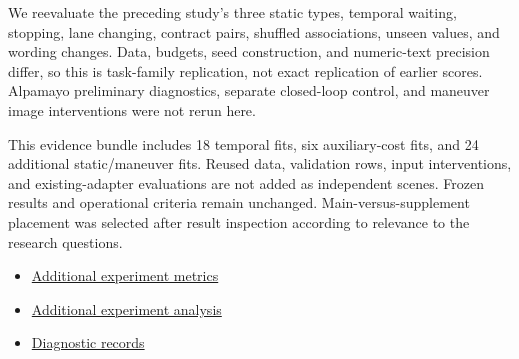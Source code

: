 \documentclass[11pt,a4paper]{article}
\begin{document}
We reevaluate the preceding study's three static types, temporal waiting, stopping, lane changing, contract pairs, shuffled associations, unseen values, and wording changes. Data, budgets, seed construction, and numeric-text precision differ, so this is task-family replication, not exact replication of earlier scores. Alpamayo preliminary diagnostics, separate closed-loop control, and maneuver image interventions were not rerun here.\par

This evidence bundle includes 18 temporal fits, six auxiliary-cost fits, and 24 additional static/maneuver fits. Reused data, validation rows, input interventions, and existing-adapter evaluations are not added as independent scenes. Frozen results and operational criteria remain unchanged. Main-versus-supplement placement was selected after result inspection according to relevance to the research questions.\par

\begin{itemize}\setlength{\itemsep}{0pt}\setlength{\parsep}{0pt}\setlength{\topsep}{2pt}
\item \href{\detokenize{../experiments-section-2026-09-30-003/multitask_metrics.csv}}{Additional experiment metrics}
\item \href{\detokenize{../../../../../../../guardsynth-cc-worktrees/guardsynth-additional-20260930/artifacts/projects/guardsynth-coc/public/paper1-method-preservation-001/multitask-contract-analysis-2026-09-30-001/REPORT_KO.md}}{Additional experiment analysis}
\item \href{\detokenize{../../paper1-temporal-diversity-001/expanded-diagnostics-analysis-2026-09-30-001/RESULT.json}}{Diagnostic records}
\end{itemize}
\end{document}
